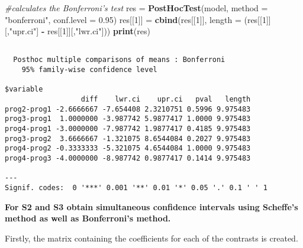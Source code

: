 \documentclass[]{article}
\newenvironment{Shaded}{\begin{snugshade}}{\end{snugshade}}
\newcommand{\KeywordTok}[1]{\textcolor[rgb]{0.13,0.29,0.53}{\textbf{#1}}}
\newcommand{\DataTypeTok}[1]{\textcolor[rgb]{0.13,0.29,0.53}{#1}}
\newcommand{\DecValTok}[1]{\textcolor[rgb]{0.00,0.00,0.81}{#1}}
\newcommand{\FloatTok}[1]{\textcolor[rgb]{0.00,0.00,0.81}{#1}}
\newcommand{\StringTok}[1]{\textcolor[rgb]{0.31,0.60,0.02}{#1}}
\newcommand{\CommentTok}[1]{\textcolor[rgb]{0.56,0.35,0.01}{\textit{#1}}}
\newcommand{\OperatorTok}[1]{\textcolor[rgb]{0.81,0.36,0.00}{\textbf{#1}}}
\newcommand{\NormalTok}[1]{#1}
\begin{document}
\begin{Shaded}
\begin{Highlighting}[]
\CommentTok{#calculates the Bonferroni's test}
\NormalTok{res =}\StringTok{ }\KeywordTok{PostHocTest}\NormalTok{(model, }\DataTypeTok{method =} \StringTok{"bonferroni"}\NormalTok{, }\DataTypeTok{conf.level =} \FloatTok{0.95}\NormalTok{)  }
\NormalTok{res[[}\DecValTok{1}\NormalTok{]] =}\StringTok{ }\KeywordTok{cbind}\NormalTok{(res[[}\DecValTok{1}\NormalTok{]], }\DataTypeTok{length =}\NormalTok{ (res[[}\DecValTok{1}\NormalTok{]][,}\StringTok{"upr.ci"}\NormalTok{] }\OperatorTok{-}\StringTok{ }\NormalTok{res[[}\DecValTok{1}\NormalTok{]][,}\StringTok{"lwr.ci"}\NormalTok{]))}
\KeywordTok{print}\NormalTok{(res)}
\end{Highlighting}
\end{Shaded}

\begin{verbatim}

  Posthoc multiple comparisons of means : Bonferroni 
    95% family-wise confidence level

$variable
                  diff    lwr.ci    upr.ci   pval   length    
prog2-prog1 -2.6666667 -7.654408 2.3210751 0.5996 9.975483    
prog3-prog1  1.0000000 -3.987742 5.9877417 1.0000 9.975483    
prog4-prog1 -3.0000000 -7.987742 1.9877417 0.4185 9.975483    
prog3-prog2  3.6666667 -1.321075 8.6544084 0.2027 9.975483    
prog4-prog2 -0.3333333 -5.321075 4.6544084 1.0000 9.975483    
prog4-prog3 -4.0000000 -8.987742 0.9877417 0.1414 9.975483    

---
Signif. codes:  0 '***' 0.001 '**' 0.01 '*' 0.05 '.' 0.1 ' ' 1
\end{verbatim}

\textbf{For S2 and S3 obtain simultaneous confidence intervals using
Scheffe's method as well as Bonferroni's method.}

Firstly, the matrix containing the coefficients for each of the
contrasts is created.

\begin{Shaded}
\end{Shaded}
\end{document}
